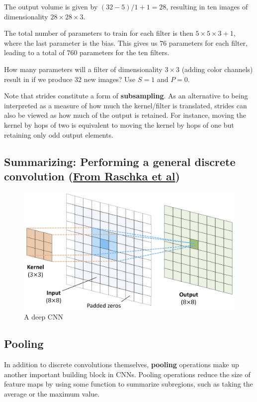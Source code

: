 \documentclass[%
oneside,                 %
final,                   %
10pt]{article}
\begin{document}
The output volume is given by $(32-5)/1+1=28$, resulting in ten images
of dimensionality $28\times 28\times 3$.

The total number of parameters to train for each filter is then
$5\times 5\times 3+1$, where the last parameter is the bias. This
gives us $76$ parameters for each filter, leading to a total of $760$
parameters for the ten filters.

How many parameters will a filter of dimensionality $3\times 3$
(adding color channels) result in if we produce $32$ new images? Use $S=1$ and $P=0$.

Note that strides constitute a form of \textbf{subsampling}. As an alternative to
being interpreted as a measure of how much the kernel/filter is translated, strides
can also be viewed as how much of the output is retained. For instance, moving
the kernel by hops of two is equivalent to moving the kernel by hops of one but
retaining only odd output elements.

\subsection{Summarizing: Performing a general discrete convolution (\href{{https://github.com/rasbt/machine-learning-book}}{From Raschka et al})}

\begin{figure}[!ht]  %
  \centerline{\includegraphics[width=0.67\linewidth]{figslides/discreteconv1.png}}
  \caption{
  A deep CNN
  }
\end{figure}

\subsection{Pooling}

In addition to discrete convolutions themselves, \textbf{pooling} operations
make up another important building block in CNNs. Pooling operations reduce
the size of feature maps by using some function to summarize subregions, such
as taking the average or the maximum value.
\end{document}
